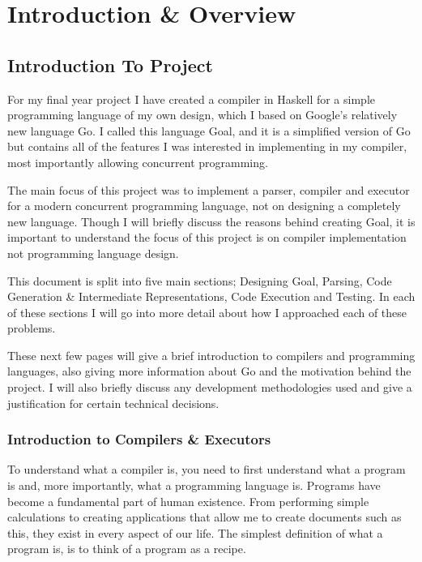 
\chapter{Introduction \& Overview}

\section{Introduction To Project}

For my final year project I have created a compiler in Haskell for a simple programming language of my own design, which I based on Google's relatively new language Go. I called this language Goal, and it is a simplified version of Go but contains all of the features I was interested in implementing in my compiler, most importantly allowing concurrent programming.

The main focus of this project was to implement a parser, compiler and executor for a modern concurrent programming language, not on designing a completely new language. Though I will briefly discuss the reasons behind creating Goal, it is important to understand the focus of this project is on compiler implementation not programming language design.

This document is split into five main sections; Designing Goal, Parsing, Code Generation \& Intermediate Representations, Code Execution and Testing. In each of these sections I will go into more detail about how I approached each of these problems. 

These next few pages will give a brief introduction to compilers and programming languages, also giving more information about Go and the motivation behind the project. I will also briefly discuss any development methodologies used and give a justification for certain technical decisions.

\subsection{Introduction to Compilers \& Executors}

To understand what a compiler is, you need to first understand what a program is and, more importantly, what a programming language is. Programs have become a fundamental part of human existence. From performing simple calculations to creating applications that allow me to create documents such as this, they exist in every aspect of our life. The simplest definition of what a program is, is to think of a program as a recipe.  

